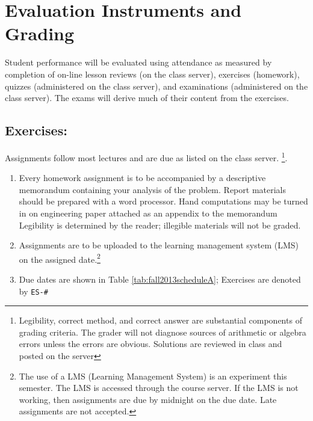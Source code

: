 \documentclass[12pt]{article}
\begin{document}
\section*{Evaluation Instruments and Grading}
Student performance will be evaluated using attendance as measured by completion of on-line lesson reviews (on the class server), exercises (homework), quizzes (administered on the class server), and examinations  (administered on the class server).   The exams will derive much of their content from the exercises.  %


\subsection*{Exercises:} 
Assignments follow most lectures and are due as listed on the class server.  
\footnote{Legibility, correct method, and correct answer are substantial components of grading criteria.   The grader will not diagnose sources of arithmetic or algebra errors unless the errors are obvious.  Solutions are reviewed in class and posted on the server}.
\begin{enumerate}
\item Every homework assignment is to be accompanied by a descriptive memorandum containing your analysis
of the problem. 
Report materials should be prepared with a word processor. 
Hand computations may be turned in on engineering paper attached as an appendix to the memorandum
Legibility is determined by the reader; illegible materials will not be graded.
\item Assignments are to be uploaded to the learning management system (LMS) on the assigned date.\footnote{The use of a LMS (Learning Management System) is an experiment this semester.  The LMS is accessed through the course server.  If the LMS is not working, then assignments are due by midnight on the due date. Late assignments are not accepted.}
\item Due dates are shown in Table \ref{tab:fall2013scheduleA};  Exercises are denoted by \texttt{ES-\#}
\end{enumerate}
\end{document}
